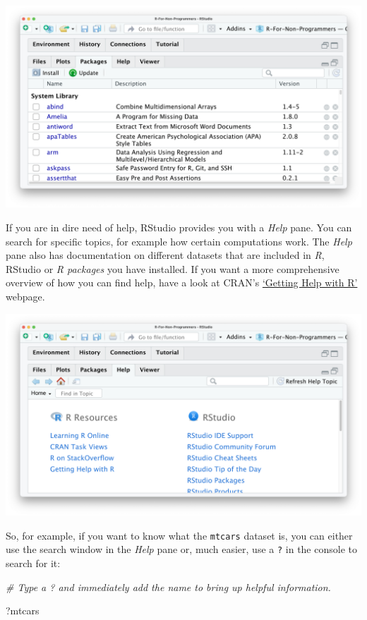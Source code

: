\documentclass[
]{book}
\newenvironment{Shaded}{\begin{snugshade}}{\end{snugshade}}
\newcommand{\CommentTok}[1]{\textcolor[rgb]{0.56,0.35,0.01}{\textit{#1}}}
\newcommand{\NormalTok}[1]{#1}
\begin{document}
\includegraphics{images/chapter_04_img/05_files_plots_etc/03_rstudio_packages.png}

If you are in dire need of help, RStudio provides you with a \emph{Help} pane. You can search for specific topics, for example how certain computations work. The \emph{Help} pane also has documentation on different datasets that are included in \emph{R}, RStudio or \emph{R packages} you have installed. If you want a more comprehensive overview of how you can find help, have a look at CRAN's \href{https://www.r-project.org/help.html}{`Getting Help with R'} webpage.

\includegraphics{images/chapter_04_img/05_files_plots_etc/04_rstudio_help.png}

So, for example, if you want to know what the \texttt{mtcars} dataset is, you can either use the search window in the \emph{Help} pane or, much easier, use a \texttt{?} in the console to search for it:

\begin{Shaded}
\begin{Highlighting}[]
\CommentTok{\# Type a \textquotesingle{}?\textquotesingle{} and immediately add the name to bring up helpful information.}

\NormalTok{?mtcars}
\end{Highlighting}
\end{Shaded}
\end{document}
